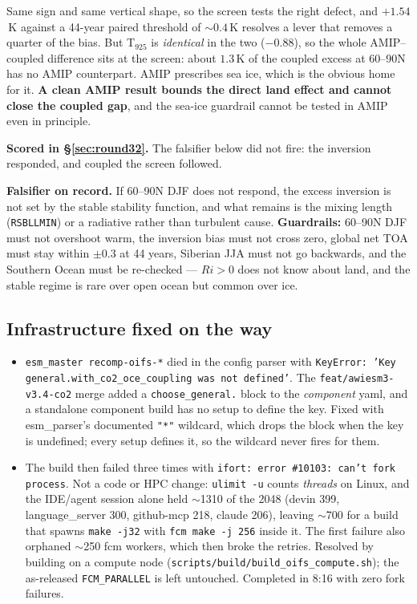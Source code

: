 \documentclass[10pt]{article}
\begin{document}
Same sign and same vertical shape, so the screen tests the right defect, and $+1.54$\,K
against a 44-year paired threshold of $\sim 0.4$\,K resolves a lever that removes a
quarter of the bias. But T$_{925}$ is \emph{identical} in the two ($-0.88$), so the whole
AMIP--coupled difference sits at the screen: about $1.3$\,K of the coupled excess at
60--90N has no AMIP counterpart. AMIP prescribes sea ice, which is the obvious home for
it. \textbf{A clean AMIP result bounds the direct land effect and cannot close the coupled
gap}, and the sea-ice guardrail cannot be tested in AMIP even in principle.

\textbf{Scored in \S\ref{sec:round32}.} The falsifier below did not fire: the inversion
responded, and coupled the screen followed.

\textbf{Falsifier on record.} If 60--90N DJF does not respond, the excess inversion is not
set by the stable stability function, and what remains is the mixing length
(\texttt{RSBLLMIN}) or a radiative rather than turbulent cause. \textbf{Guardrails:}
60--90N DJF must not overshoot warm, the inversion bias must not cross zero, global net
TOA must stay within $\pm0.3$ at 44 years, Siberian JJA must not go backwards, and the
Southern Ocean must be re-checked --- $Ri>0$ does not know about land, and the stable
regime is rare over open ocean but common over ice.

\subsection{Infrastructure fixed on the way}\label{sub:r31infra}

\begin{itemize}\itemsep1pt
\item \texttt{esm\_master recomp-oifs-*} died in the config parser with
\texttt{KeyError: 'Key general.with\_co2\_oce\_coupling was not defined'}. The
\texttt{feat/awiesm3-v3.4-co2} merge added a \texttt{choose\_general.} block to the
\emph{component} yaml, and a standalone component build has no setup to define the key.
Fixed with esm\_parser's documented \texttt{"*"} wildcard, which drops the block when the
key is undefined; every setup defines it, so the wildcard never fires for them.
\item The build then failed three times with \texttt{ifort: error \#10103: can't fork
process}. Not a code or HPC change: \texttt{ulimit -u} counts \emph{threads} on Linux, and
the IDE/agent session alone held $\sim$1310 of the 2048 (devin 399, language\_server 300,
github-mcp 218, claude 206), leaving $\sim$700 for a build that spawns \texttt{make -j32}
with \texttt{fcm make -j 256} inside it. The first failure also orphaned $\sim$250 fcm
workers, which then broke the retries. Resolved by building on a compute node
(\texttt{scripts/build/build\_oifs\_compute.sh}); the as-released \texttt{FCM\_PARALLEL}
is left untouched. Completed in 8:16 with zero fork failures.
\end{itemize}
\end{document}
